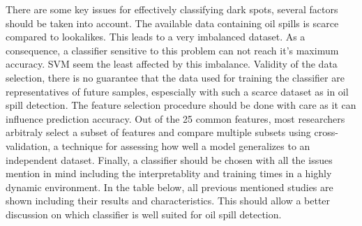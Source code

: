 There are some key issues for effectively classifying dark spots, several factors should be taken into account\cite{Kubat:1998:MLD:288808.288812}. The available data containing oil spills is scarce compared to lookalikes. This leads to a very imbalanced dataset. As a consequence, a classifier sensitive to this problem can not reach it's maximum accuracy\cite{Japkowicz20026}. SVM seem the least affected by this imbalance. Validity of the data selection, there is no guarantee that the data used for training the classifier are representatives of future samples, espescially with such a scarce dataset as in oil spill detection. The feature selection procedure should be done with care as it can influence prediction accuracy. Out of the 25 common features, most researchers arbitraly select a subset of features and compare multiple subsets using cross-validation, a technique for assessing how well a model generalizes to an independent dataset. Finally, a classifier should be chosen with all the issues mention in mind including the interpretablity and training times in a highly dynamic environment. In the table below, all previous mentioned studies are shown including their results and characteristics. This should allow a better discussion on which classifier is well suited for oil spill detection.

